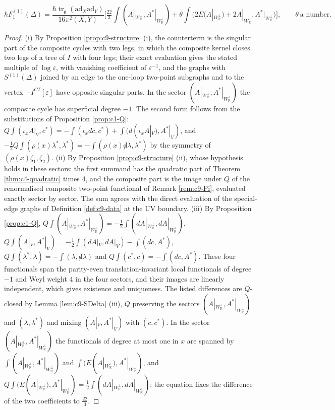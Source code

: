 \begin{theorem}
\begin{itemize}
\begin{equation}
\hbar F_1^{(1)}(\Delta)=\frac{\hbar\operatorname{tr}_{\mathfrak g}(\mathrm{ad}_X\mathrm{ad}_Y)}{16\pi^2(X,Y)}\Big[\tfrac{22}3\int(A|_{W_{\mathbb R}^\perp},A^*|_{W_{\mathbb R}^\perp})+\theta\int\big(2E(A|_{W_{\mathbb R}^\perp})+2A|_{W_{\mathbb R}^\perp},A^*|_{W_{\mathbb R}^\perp}\big)\Big],\qquad\theta\ \text{a number}.
\label{eq:c9-Fperp}
\end{equation}
\end{itemize}
\end{theorem}

\begin{proof}
(i) By Proposition \ref{prop:c9-structure} (i), the counterterm is the singular part of the composite cycles with two legs, in which the composite kernel closes two legs of a tree of $I$ with four legs; their exact evaluation gives the stated multiple of $\log\varepsilon$, with vanishing coefficient of $\varepsilon^{-1}$, and the graphs with $S^{(1)}(\Delta)$ joined by an edge to the one-loop two-point subgraphs and to the vertex $-I^{CT}[\varepsilon]$ have opposite singular parts. In the sector $(A|_{W_{\mathbb R}^\perp},A^*|_{W_{\mathbb R}^\perp})$ the composite cycle has superficial degree $-1$. The second form follows from the substitutions of Proposition \ref{prop:c1-Q}: $Q\int(\iota_xA|_V,c^*)=-\int(\iota_xdc,c^*)+\int(d(\iota_xA|_V),A^*|_V)$, and $-\tfrac12Q\int(\rho(x)\lambda^*,\lambda^*)=-\int(\rho(x){\not d}\lambda,\lambda^*)$ by the symmetry of $(\rho(x)\zeta_1,\zeta_2)$. (ii) By Proposition \ref{prop:c9-structure} (ii), whose hypothesis holds in these sectors: the first summand has the quadratic part of Theorem \ref{thm:c4-quadratic} times $4$, and the composite part is the image under $Q$ of the renormalised composite two-point functional of Remark \ref{rem:c9-Pi}, evaluated exactly sector by sector. The sum agrees with the direct evaluation of the special-edge graphs of Definition \ref{def:c9-data} at the UV boundary. (iii) By Proposition \ref{prop:c1-Q}, $Q\int(A|_{W_{\mathbb R}^\perp},A^*|_{W_{\mathbb R}^\perp})=-\tfrac12\int(dA|_{W_{\mathbb R}^\perp},dA|_{W_{\mathbb R}^\perp})$, $Q\int(A|_V,A^*|_V)=-\tfrac12\int(dA|_V,dA|_V)-\int(dc,A^*)$, $Q\int(\lambda^*,\lambda)=-\int(\lambda,{\not d}\lambda)$ and $Q\int(c^*,c)=-\int(dc,A^*)$. These four functionals span the parity-even translation-invariant local functionals of degree $-1$ and Weyl weight $4$ in the four sectors, and their images are linearly independent, which gives existence and uniqueness. The listed differences are $Q$-closed by Lemma \ref{lem:c9-SDelta} (iii), $Q$ preserving the sectors $(A|_{W_{\mathbb R}^\perp},A^*|_{W_{\mathbb R}^\perp})$ and $(\lambda,\lambda^*)$ and mixing $(A|_V,A^*|_V)$ with $(c,c^*)$. In the sector $(A|_{W_{\mathbb R}^\perp},A^*|_{W_{\mathbb R}^\perp})$ the functionals of degree at most one in $x$ are spanned by $\int(A|_{W_{\mathbb R}^\perp},A^*|_{W_{\mathbb R}^\perp})$ and $\int(E(A|_{W_{\mathbb R}^\perp}),A^*|_{W_{\mathbb R}^\perp})$, and $Q\int(E(A|_{W_{\mathbb R}^\perp}),A^*|_{W_{\mathbb R}^\perp})=\tfrac12\int(dA|_{W_{\mathbb R}^\perp},dA|_{W_{\mathbb R}^\perp})$; the equation fixes the difference of the two coefficients to $\tfrac{22}3$.

\end{proof}
